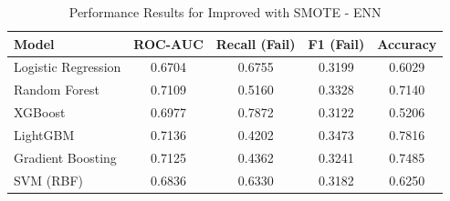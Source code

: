 \begin{table}[htbp]
\caption{Performance Results for Improved with SMOTE - ENN}
\label{tab:improved_smote - enn}
\begin{tabular}{lcccc}
\toprule

Model & ROC-AUC & Recall (Fail) & F1 (Fail) & Accuracy \\
\midrule

Logistic Regression & 0.6704 & 0.6755 & 0.3199 & 0.6029 \\
Random Forest & 0.7109 & 0.5160 & 0.3328 & 0.7140 \\
XGBoost & 0.6977 & 0.7872 & 0.3122 & 0.5206 \\
LightGBM & 0.7136 & 0.4202 & 0.3473 & 0.7816 \\
Gradient Boosting & 0.7125 & 0.4362 & 0.3241 & 0.7485 \\
SVM (RBF) & 0.6836 & 0.6330 & 0.3182 & 0.6250 \\
\bottomrule

\end{tabular}
\end{table}
